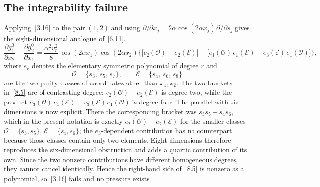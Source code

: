 \documentclass[11pt]{jfm}
\numberwithin{equation}{section}
\begin{document}
\subsection{The integrability failure}
Applying~\eqref{3.16} to the pair $(1,2)$ and using $\partial/\partial x_j = 2\alpha\cos(2\alpha
x_j)\,\partial/\partial s_j$ gives the eight-dimensional analogue of~\eqref{6.11},
\begin{equation}
\label{8.5}
\frac{\partial g_1^0}{\partial x_2}-\frac{\partial g_2^0}{\partial x_1}
=\frac{\alpha^2 v_r^2}{8}\,\cos(2\alpha x_1)\cos(2\alpha x_2)
\Big\{\big[e_2(\mathcal{O})-e_2(\mathcal{E})\big]
-\big[e_3(\mathcal{O})\,e_1(\mathcal{E})-e_3(\mathcal{E})\,e_1(\mathcal{O})\big]\Big\},
\end{equation}
where $e_r$ denotes the elementary symmetric polynomial of degree $r$ and
\begin{equation}
\label{8.6}
\mathcal{O}=\{s_3,\,s_5,\,s_7\},\qquad \mathcal{E}=\{s_4,\,s_6,\,s_8\}
\end{equation}
are the two parity classes of coordinates other than $x_1,x_2$. The two brackets
in~\eqref{8.5} are of contrasting degree: $e_2(\mathcal{O})-e_2(\mathcal{E})$ is degree two,
while the product $e_3(\mathcal{O})\,e_1(\mathcal{E})-e_3(\mathcal{E})\,e_1(\mathcal{O})$ is degree
four. The parallel with six dimensions
is now explicit. There the corresponding bracket was $s_3s_5-s_4s_6$, which in the present
notation is exactly $e_2(\mathcal{O})-e_2(\mathcal{E})$ for the smaller classes
$\mathcal{O}=\{s_3,s_5\}$, $\mathcal{E}=\{s_4,s_6\}$; the $e_3$-dependent contribution has no counterpart
because those classes contain only two elements. Eight dimensions therefore reproduces the
six-dimensional obstruction and adds a quartic contribution of its own. Since the two nonzero
contributions have different homogeneous degrees, they cannot cancel identically. Hence the
right-hand side of~\eqref{8.5} is nonzero as a polynomial, so~\eqref{3.16} fails and no pressure
exists.
\end{document}
